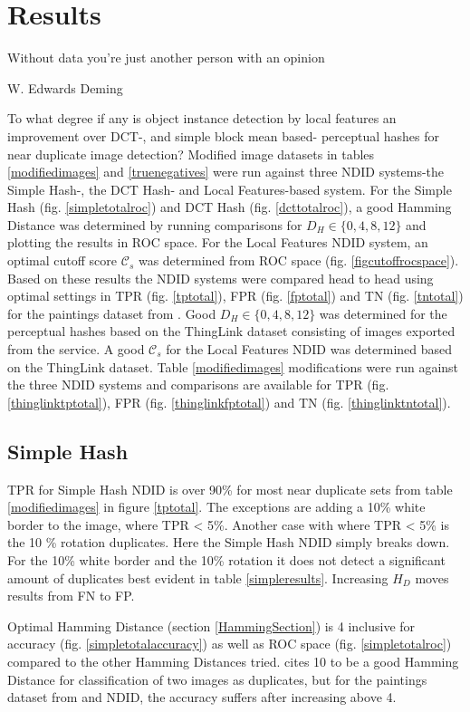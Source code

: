\documentclass[english,12pt,a4paper,pdftex,elec,utf8]{aaltothesis}
\begin{document}
\clearpage

\section{Results}
\epigraph{Without data you're just another person with an opinion}{W. Edwards Deming}
To what degree if any is object instance detection by local features an improvement over DCT-, and simple block mean based- perceptual hashes for near duplicate image detection? Modified image datasets in tables \ref{modifiedimages} and \ref{truenegatives} were run against three NDID systems-the Simple Hash-, the DCT Hash- and Local Features-based system. For the Simple Hash (fig. \ref{simpletotalroc}) and DCT Hash (fig. \ref{dcttotalroc}), a good Hamming Distance was determined by running comparisons for $D_H \in \{0,4,8,12\}$ and plotting the results in ROC space. For the Local Features NDID system, an optimal cutoff score $\mathcal{C}_s$ was determined from ROC space (fig. \ref{figcutoffrocspace}). Based on these results the NDID systems were compared head to head using optimal settings in TPR (fig. \ref{tptotal}), FPR (fig. \ref{fptotal}) and TN (fig. \ref{tntotal}) for the paintings dataset from \cite{Vedaldi2012}.
Good $D_H \in \{0,4,8,12\}$ was determined for the perceptual hashes based on the ThingLink dataset consisting of images exported from the service. A good $\mathcal{C}_s$ for the Local Features NDID was determined based on the ThingLink dataset. Table \ref{modifiedimages} modifications were run against the three NDID systems and comparisons are available for TPR (fig. \ref{thinglinktptotal}), FPR (fig. \ref{thinglinkfptotal}) and TN (fig. \ref{thinglinktntotal}).

\subsection{Simple Hash}
TPR for Simple Hash NDID is over 90\% for most near duplicate sets from table \ref{modifiedimages} in figure \ref{tptotal}. The exceptions are adding a 10\% white border to the image, where TPR < 5\%. Another case with where TPR < 5\% is the 10 \% rotation duplicates. Here the Simple Hash NDID simply breaks down. For the 10\% white border and the 10\% rotation it does not detect a significant amount of duplicates best evident in table \ref{simpleresults}. Increasing $H_D$ moves results from FN to FP.

Optimal Hamming Distance (section \ref{HammingSection}) is 4 inclusive for accuracy (fig. \ref{simpletotalaccuracy}) as well as ROC space (fig. \ref{simpletotalroc}) compared to the other Hamming Distances tried. \cite{Zauner2010} cites 10 to be a good Hamming Distance for classification of two images as duplicates, but for the paintings dataset from \cite{Vedaldi2012} and NDID, the accuracy suffers after increasing above 4.
\end{document}
